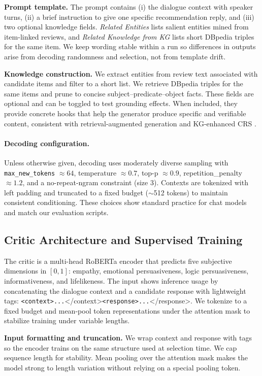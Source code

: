 \documentclass[12pt]{article}
\begin{document}
  \textbf{Prompt template.} The prompt contains (i) the dialogue context with speaker turns, (ii) a brief instruction to give one specific recommendation reply, and (iii) two optional knowledge fields. \emph{Related Entities} lists salient entities mined from item-linked reviews, and \emph{Related Knowledge from KG} lists short DBpedia triples for the same item. We keep wording stable within a run so differences in outputs arise from decoding randomness and selection, not from template drift.

  \textbf{Knowledge construction.} We extract entities from review text associated with candidate items and filter to a short list. We retrieve DBpedia triples for the same items and prune to concise subject–predicate–object facts. These fields are optional and can be toggled to test grounding effects. When included, they provide concrete hooks that help the generator produce specific and verifiable content, consistent with retrieval-augmented generation \citep{lewis2020rag} and KG-enhanced CRS \citep{chen2020kbrd,zhou2020kgsf}.
  
  \paragraph{Decoding configuration.} Unless otherwise given, decoding uses moderately diverse sampling with \texttt{max\_new\_tokens} $\approx 64$, temperature $\approx 0.7$, top-p $\approx 0.9$, repetition\_penalty $\approx 1.2$, and a no-repeat-ngram constraint (size 3). Contexts are tokenized with left padding and truncated to a fixed budget (\(\sim\)512 tokens) to maintain consistent conditioning. These choices show standard practice for chat models and match our evaluation scripts.
  
  \subsection{Critic Architecture and Supervised Training}
  The critic is a multi-head RoBERTa encoder that predicts five subjective dimensions in \([0,1]\): empathy, emotional persuasiveness, logic persuasiveness, informativeness, and lifelikeness. The input shows inference usage by concatenating the dialogue context and a candidate response with lightweight tags: \texttt{<context>...}</context>\texttt{<response>...}</response>. We tokenize to a fixed budget and mean-pool token representations under the attention mask to stabilize training under variable lengths.

  \textbf{Input formatting and truncation.} We wrap context and response with tags so the encoder trains on the same structure used at selection time. We cap sequence length for stability. Mean pooling over the attention mask makes the model strong to length variation without relying on a special pooling token.
  
\end{document}
